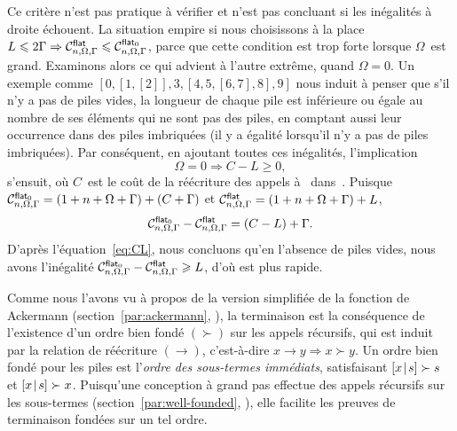  Ce critère n'est pas pratique à vérifier
et n'est pas concluant si les inégalités à droite échouent. La
situation empire si nous choisissons à la place \(L \leqslant 2\Gamma
\Rightarrow \smash[t]{\C{\fun{flat}}{n,\Omega,\Gamma}} \leqslant
\smash[t]{\C{\fun{flat}_0}{n,\Omega,\Gamma}}\), parce que cette
condition est trop forte lorsque \(\Omega\)~est grand. Examinons alors
ce qui advient à l'autre extrême, quand \(\Omega = 0\). Un exemple
comme \([0,[1,[2]],3,[4,5,[6,7],8],9]\) nous induit à penser que s'il
n'y a pas de piles vides, la longueur de chaque pile est inférieure ou
égale au nombre de ses éléments qui ne sont pas des piles, en comptant
aussi leur occurrence dans des piles imbriquées (il y a égalité
lorsqu'il n'y a pas de piles imbriquées). Par conséquent, en ajoutant
toutes ces inégalités, l'implication
\begin{equation}
  \Omega = 0 \Rightarrow C - L \geqslant 0, \label{eq:CL}
\end{equation}
s'ensuit, où \(C\)~est le coût de la réécriture des appels
à~
dans~. Puisque
\(\C{\smash{\fun{flat}_0}}{n,\Omega,\Gamma} = (1 + n + \Omega +
\Gamma) + (C + \Gamma)\) et \(\C{\fun{flat}}{n,\Omega,\Gamma} = (1 +
n + \Omega + \Gamma) + L\),
\begin{equation*}
  \C{\smash{\fun{flat}_0}}{n,\Omega,\Gamma} -
  \C{\fun{flat}}{n,\Omega,\Gamma} =
  (C - L) + \Gamma.
\end{equation*}
D'après l'équation~\eqref{eq:CL}, nous concluons qu'en l'absence de
piles vides, nous avons l'inégalité
\(\C{\smash{\fun{flat}_0}}{n,\Omega,\Gamma} -
\C{\fun{flat}}{n,\Omega,\Gamma} \geqslant L\), d'où
 est plus rapide.

\label{flattening_termination}

Comme nous l'avons vu à propos de la version simplifiée de la fonction
de Ackermann (section~\ref{par:ackermann}, ),
la terminaison est la conséquence de l'existence d'un ordre bien fondé
\((\succ)\) sur les appels récursifs, qui est induit par la relation
de réécriture \((\rightarrow)\), c'est-à-dire \(x \rightarrow y
\Rightarrow x \succ y\). Un ordre bien fondé pour les piles est
l'\emph{ordre des sous-termes immédiats}, satisfaisant \(\cons{x}{s}
\succ s\) et \(\cons{x}{s} \succ x\). Puisqu'une conception à grand
pas effectue des appels récursifs sur les sous-termes
(section~\ref{par:well-founded}, ), elle
facilite les preuves de terminaison fondées sur un tel
ordre.

